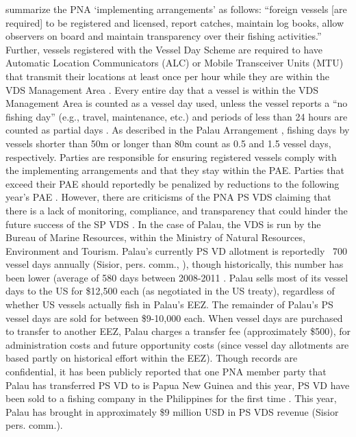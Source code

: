 \documentclass[11pt,english]{article}
\begin{document}
\cite{yeeting2018stabilising} summarize the PNA ‘implementing arrangements’ as follows: “foreign vessels [are required] to be registered and licensed, report catches, maintain log books, allow observers on board and maintain transparency over their fishing activities.” Further, vessels registered with the Vessel Day Scheme are required to have Automatic Location Communicators (ALC) or Mobile Transceiver Units (MTU) that transmit their locations at least once per hour while they are within the VDS Management Area \citep{PNA2016}. Every entire day that a vessel is within the VDS Management Area is counted as a vessel day used, unless the vessel reports a “no fishing day” (e.g., travel, maintenance, etc.) and periods of less than 24 hours are counted as partial days \citep{PNA2016}.  As described in the Palau Arrangement \citep{PNA2016}, fishing days by vessels shorter than 50m or longer than 80m count as 0.5 and 1.5 vessel days, respectively. Parties are responsible for ensuring registered vessels comply with the implementing arrangements and that they stay within the PAE. Parties that exceed their PAE should reportedly be penalized by reductions to the following year’s PAE \citep{PNA2016}. However, there are criticisms of the PNA PS VDS claiming that there is a lack of monitoring, compliance, and transparency that could hinder the future success of the SP VDS \citep{Arnason2014,yeeting2018stabilising}. In the case of Palau, the VDS is run by the Bureau of Marine Resources, within the Ministry of Natural Resources, Environment and Tourism.
Palau’s currently PS VD allotment is reportedly ~700 vessel days annually (Sisior, pers. comm., \cite{Pojas2018}), though historically, this number has been lower (average of 580 days between 2008-2011 \citep{Tewid2013}. Palau sells most of its vessel days to the US for \$12,500 each (as negotiated in the US treaty), regardless of whether US vessels actually fish in Palau’s EEZ. The remainder of Palau’s PS vessel days are sold for between \$9-10,000 each. When vessel days are purchased to transfer to another EEZ, Palau charges a transfer fee (approximately \$500), for administration costs and future opportunity costs (since vessel day allotments are based partly on historical effort within the EEZ). Though records are confidential, it has been publicly reported that one PNA member party that Palau has transferred PS VD to is Papua New Guinea \citep{Tewid2013} and this year, PS VD have been sold to a fishing company in the Philippines for the first time \citep{Pojas2018}. This year, Palau has brought in approximately \$9 million USD in PS VDS revenue (Sisior pers. comm.). 
\end{document}
